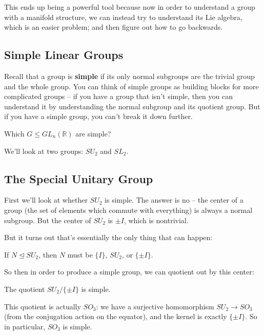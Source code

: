 This ends up being a powerful tool because now in order to understand a group with a manifold structure, we can instead try to understand its Lie algebra, which is an easier problem; and then figure out how to go backwards. 

\subsection{Simple Linear Groups}

Recall that a group is \textbf{simple} if its only normal subgroups are the trivial group and the whole group. You can think of simple groups as building blocks for more complicated groups -- if you have a group that isn't simple, then you can understand it by understanding the normal subgroup and its quotient group. But if you have a simple group, you can't break it down further. 

\begin{qq}
Which $G \leq GL_n(\mathbb{R})$ are simple?
\end{qq}

We'll look at two groups: $SU_2$ and $SL_2$. 

\subsection{The Special Unitary Group}

First we'll look at whether $SU_2$ is simple. The answer is no -- the center of a group (the set of elements which commute with everything) is always a normal subgroup. But the center of $SU_2$ is $\pm I$, which is nontrivial. 

But it turns out that's essentially the only thing that can happen: 

\begin{theorem}\label{su2normal}
    If $N \trianglelefteq SU_2$, then $N$ must be $\{I\}$, $SU_2$, or $\{\pm I\}$.
\end{theorem}

So then in order to produce a simple group, we can quotient out by this center:

\begin{corollary}\label{so3simple}
    The quotient $SU_2/\{\pm I\}$ is simple. 
\end{corollary}

This quotient is actually $SO_3$: we have a surjective homomorphism $SU_2 \to SO_3$ (from the conjugation action on the equator), and the kernel is exactly $\{\pm I\}$. So in particular, $SO_3$ is simple. 

